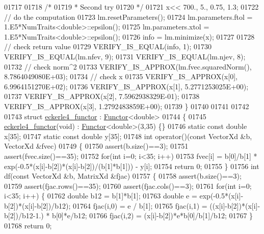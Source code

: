 \begin{DoxyCode}
01717 
01718   \textcolor{comment}{/*}
01719 \textcolor{comment}{   * Second try}
01720 \textcolor{comment}{   */}
01721   x<< 700., 5., 0.75, 1.3;
01722   \textcolor{comment}{// do the computation}
01723   lm.resetParameters();
01724   lm.parameters.ftol = 1.E5*NumTraits<double>::epsilon();
01725   lm.parameters.xtol = 1.E5*NumTraits<double>::epsilon();
01726   info = lm.minimize(x);
01727 
01728   \textcolor{comment}{// check return value}
01729   VERIFY\_IS\_EQUAL(info, 1);
01730   VERIFY\_IS\_EQUAL(lm.nfev, 9);
01731   VERIFY\_IS\_EQUAL(lm.njev, 8);
01732   \textcolor{comment}{// check norm^2}
01733   VERIFY\_IS\_APPROX(lm.fvec.squaredNorm(), 8.7864049080E+03);
01734   \textcolor{comment}{// check x}
01735   VERIFY\_IS\_APPROX(x[0], 6.9964151270E+02);
01736   VERIFY\_IS\_APPROX(x[1], 5.2771253025E+00);
01737   VERIFY\_IS\_APPROX(x[2], 7.5962938329E-01);
01738   VERIFY\_IS\_APPROX(x[3], 1.2792483859E+00);
01739 \}
01740 
01741 
01742 
01743 \textcolor{keyword}{struct }\hyperlink{structeckerle4__functor}{eckerle4\_functor} : \hyperlink{struct_functor}{Functor}<double>
01744 \{
01745     \hyperlink{structeckerle4__functor}{eckerle4\_functor}(\textcolor{keywordtype}{void}) : \hyperlink{struct_functor}{Functor}<double>(3,35) \{\}
01746     \textcolor{keyword}{static} \textcolor{keyword}{const} \textcolor{keywordtype}{double} x[35];
01747     \textcolor{keyword}{static} \textcolor{keyword}{const} \textcolor{keywordtype}{double} y[35];
01748     \textcolor{keywordtype}{int} operator()(\textcolor{keyword}{const} VectorXd &b, VectorXd &fvec)
01749     \{
01750         assert(b.size()==3);
01751         assert(fvec.size()==35);
01752         \textcolor{keywordflow}{for}(\textcolor{keywordtype}{int} i=0; i<35; i++)
01753             fvec[i] = b[0]/b[1] * exp(-0.5*(x[i]-b[2])*(x[i]-b[2])/(b[1]*b[1])) - y[i];
01754         \textcolor{keywordflow}{return} 0;
01755     \}
01756     \textcolor{keywordtype}{int} df(\textcolor{keyword}{const} VectorXd &b, MatrixXd &fjac)
01757     \{
01758         assert(b.size()==3);
01759         assert(fjac.rows()==35);
01760         assert(fjac.cols()==3);
01761         \textcolor{keywordflow}{for}(\textcolor{keywordtype}{int} i=0; i<35; i++) \{
01762             \textcolor{keywordtype}{double} b12 = b[1]*b[1];
01763             \textcolor{keywordtype}{double} e = exp(-0.5*(x[i]-b[2])*(x[i]-b[2])/b12);
01764             fjac(i,0) = e / b[1];
01765             fjac(i,1) = ((x[i]-b[2])*(x[i]-b[2])/b12-1.) * b[0]*e/b12;
01766             fjac(i,2) = (x[i]-b[2])*e*b[0]/b[1]/b12;
01767         \}
01768         \textcolor{keywordflow}{return} 0;

\end{DoxyCode}
